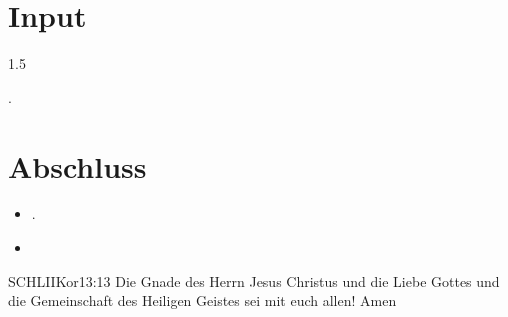 \documentclass[fontsize=14pt]{mybib}
\begin{document}
\section{Input}
\begin{spacing}{1.5}
   \begin{otsblock}[2. Petrus]
    
    \end{otsblock}    
    .
\end{spacing}
\section{Abschluss}
\begin{itemize}
    \item [] .
    \item [] 
\end{itemize}
\begin{bibelbox}{SCHL}{IIKor}{13:13}
    Die Gnade des Herrn Jesus Christus und die Liebe Gottes und die Gemeinschaft des Heiligen Geistes sei mit euch allen! Amen
\end{bibelbox}
\end{document}
